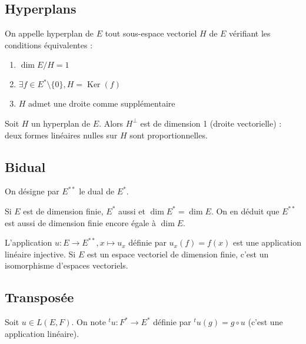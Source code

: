 \subsection{Hyperplans}

\begin{de}
On appelle hyperplan de $E$ tout sous-espace vectoriel $H$ de $E$ vérifiant les conditions équivalentes :
\begin{enumerate}
\item $\dim E/H = 1$
\item $\exists f \in E^*\setminus\{0\}, H = \operatorname{Ker}(f)$
\item $H$ admet une droite comme supplémentaire
\end{enumerate}
\end{de}

\begin{thm}
Soit $H$ un hyperplan de $E$. Alors $H^\perp$ est de dimension 1 (droite vectorielle) : deux formes linéaires nulles sur $H$ sont proportionnelles.
\end{thm}

\subsection{Bidual}

\begin{de}
On désigne par $E^{**}$ le dual de $E^*$.
\end{de}

\begin{rem}
Si $E$ est de dimension finie, $E^*$ aussi et $\dim E^* = \dim E$. On en déduit que $E^{**}$ est aussi de dimension finie encore égale à $\dim E$.
\end{rem}

\begin{thm}
L'application $u : E \to E^{**}, x \mapsto u_x$ définie par $u_x(f) = f(x)$ est une application linéaire injective. Si $E$ est un espace vectoriel de dimension finie, c'est un isomorphisme d'espaces vectoriels.
\end{thm}

\subsection{Transposée}

\begin{de}
Soit $u \in L(E,F)$. On note ${}^tu : F^* \to E^*$ définie par ${}^tu(g) = g \circ u$ (c'est une application linéaire).
\end{de}

